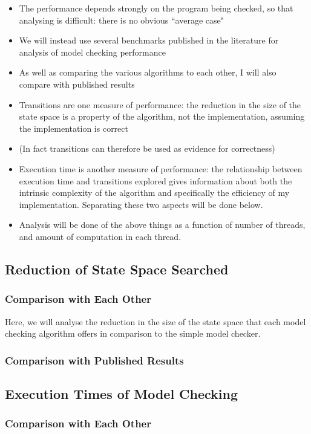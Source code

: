\documentclass[12pt,a4paper,twoside,openright]{report}
\begin{document}
\begin{itemize}
	\item The performance depends strongly
	on the program being checked, so that
	analysing is difficult: there is no
	obvious ``average case"
	\item We will instead use several
	benchmarks published in the literature
	for analysis of model checking performance
	\item As well as comparing the various
	algorithms to each other, I will also
	compare with published results
	\item Transitions are one measure of
	performance: the reduction in the size
	of the state space is a property of the
	algorithm, not the implementation, 
	assuming the implementation is correct
	\item (In fact transitions can therefore
	be used as evidence for correctness)
	\item Execution time is another measure
	of performance: the relationship between
	execution time and transitions explored
	gives information about both the
	intrinsic complexity of the algorithm
	and specifically the efficiency of my
	implementation. Separating these two
	aspects will be done below.
	\item Analysis will be done of the above
	things as a function of number of threads,
	and amount of computation in each thread.
\end{itemize}

\subsection{Reduction of State Space Searched}
\subsubsection{Comparison with Each Other}
Here, we will analyse the reduction in the size of the
state space that each model checking algorithm
offers in comparison to the simple model checker.
\subsubsection{Comparison with Published Results}

\subsection{Execution Times of Model Checking}
\subsubsection{Comparison with Each Other}
\end{document}
